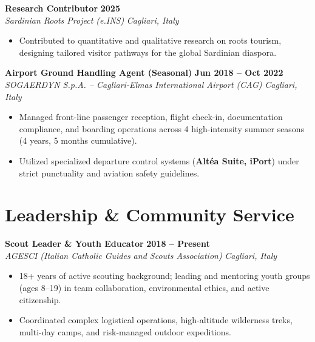 \documentclass[10pt,a4paper]{article}
\begin{document}
\vspace{3pt}
\textbf{Research Contributor} \hfill \textbf{2025} \\
\textit{Sardinian Roots Project (e.INS)} \hfill \textit{Cagliari, Italy}
\begin{itemize}
    \item Contributed to quantitative and qualitative research on roots tourism, designing tailored visitor pathways for the global Sardinian diaspora.
\end{itemize}

\vspace{3pt}
\textbf{Airport Ground Handling Agent (Seasonal)} \hfill \textbf{Jun 2018 -- Oct 2022} \\
\textit{SOGAERDYN S.p.A. -- Cagliari-Elmas International Airport (CAG)} \hfill \textit{Cagliari, Italy}
\begin{itemize}
    \item Managed front-line passenger reception, flight check-in, documentation compliance, and boarding operations across 4 high-intensity summer seasons (4 years, 5 months cumulative).
    \item Utilized specialized departure control systems (\textbf{Altéa Suite, iPort}) under strict punctuality and aviation safety guidelines.
\end{itemize}

\section{Leadership \& Community Service}

\textbf{Scout Leader \& Youth Educator} \hfill \textbf{2018 -- Present} \\
\textit{AGESCI (Italian Catholic Guides and Scouts Association)} \hfill \textit{Cagliari, Italy}
\begin{itemize}
    \item 18+ years of active scouting background; leading and mentoring youth groups (ages 8--19) in team collaboration, environmental ethics, and active citizenship.
    \item Coordinated complex logistical operations, high-altitude wilderness treks, multi-day camps, and risk-managed outdoor expeditions.
\end{itemize}
\end{document}
